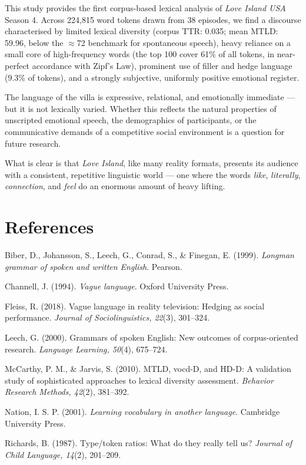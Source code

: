 \documentclass[11pt]{article}
\begin{document}
This study provides the first corpus-based lexical analysis of \emph{Love Island USA} Season 4. Across 224,815 word tokens drawn from 38 episodes, we find a discourse characterised by limited lexical diversity (corpus TTR: 0.035; mean MTLD: 59.96, below the $\approx$72 benchmark for spontaneous speech), heavy reliance on a small core of high-frequency words (the top 100 cover 61\% of all tokens, in near-perfect accordance with Zipf's Law), prominent use of filler and hedge language (9.3\% of tokens), and a strongly subjective, uniformly positive emotional register.

The language of the villa is expressive, relational, and emotionally immediate --- but it is not lexically varied. Whether this reflects the natural properties of unscripted emotional speech, the demographics of participants, or the communicative demands of a competitive social environment is a question for future research.

What is clear is that \emph{Love Island}, like many reality formats, presents its audience with a consistent, repetitive linguistic world --- one where the words \emph{like}, \emph{literally}, \emph{connection}, and \emph{feel} do an enormous amount of heavy lifting.


\section*{References}

Biber, D., Johansson, S., Leech, G., Conrad, S., \& Finegan, E. (1999). \emph{Longman grammar of spoken and written English}. Pearson.

Channell, J. (1994). \emph{Vague language}. Oxford University Press.

Fleiss, R. (2018). Vague language in reality television: Hedging as social performance. \emph{Journal of Sociolinguistics, 22}(3), 301--324.

Leech, G. (2000). Grammars of spoken English: New outcomes of corpus-oriented research. \emph{Language Learning, 50}(4), 675--724.

McCarthy, P. M., \& Jarvis, S. (2010). MTLD, vocd-D, and HD-D: A validation study of sophisticated approaches to lexical diversity assessment. \emph{Behavior Research Methods, 42}(2), 381--392.

Nation, I. S. P. (2001). \emph{Learning vocabulary in another language}. Cambridge University Press.

Richards, B. (1987). Type/token ratios: What do they really tell us? \emph{Journal of Child Language, 14}(2), 201--209.
\end{document}
